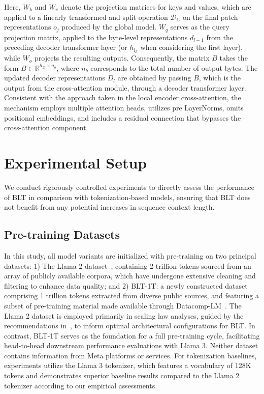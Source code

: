 Here, $W_k$ and $W_v$ denote the projection matrices for keys and values, which are applied to a linearly transformed and split operation $\mathcal{D}_C$ on the final patch representations $o_j$ produced by the global model. $W_q$ serves as the query projection matrix, applied to the byte-level representations $d_{l-1}$ from the preceding decoder transformer layer (or $h_{l_{\mathcal{E}}}$ when considering the first layer), while $W_o$ projects the resulting outputs. Consequently, the matrix $B$ takes the form $B \in \mathbb{R}^{h_{\mathcal{D}} \times n_b}$, where $n_b$ corresponds to the total number of output bytes. The updated decoder representations $D_l$ are obtained by passing $B$, which is the output from the cross-attention module, through a decoder transformer layer. Consistent with the approach taken in the local encoder cross-attention, the mechanism employs multiple attention heads, utilizes pre LayerNorms, omits positional embeddings, and includes a residual connection that bypasses the cross-attention component.

\section{Experimental Setup}
\label{section:experiments}
We conduct rigorously controlled experiments to directly assess the performance of {\textsc BLT} in comparison with tokenization-based models, ensuring that {\textsc BLT} does not benefit from any potential increases in sequence context length.

\subsection{Pre-training Datasets} In this study, all model variants are initialized with pre-training on two principal datasets: 1) The Llama 2 dataset~\citep{touvron2023llama}, containing 2 trillion tokens sourced from an array of publicly available corpora, which have undergone extensive cleaning and filtering to enhance data quality; and 2) {\textsc BLT}-1T: a newly constructed dataset comprising 1 trillion tokens extracted from diverse public sources, and featuring a subset of pre-training material made available through Datacomp-LM~\citep{li2024datacomp}. The Llama 2 dataset is employed primarily in scaling law analyses, guided by the recommendations in~\cite{dubey2024llama}, to inform optimal architectural configurations for {\textsc BLT}. In contrast, {\textsc BLT}-1T serves as the foundation for a full pre-training cycle, facilitating head-to-head downstream performance evaluations with Llama 3. Neither dataset contains information from Meta platforms or services. For tokenization baselines, experiments utilize the Llama 3 tokenizer, which features a vocabulary of 128K tokens and demonstrates superior baseline results compared to the Llama 2 tokenizer according to our empirical assessments.

